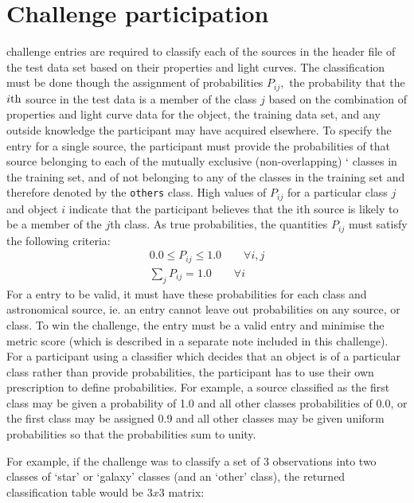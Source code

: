 \documentclass[iop,twocolumn]{emulateapj}
\newcommand{\<}      {\langle}
\renewcommand{\>}    {\rangle}
\begin{document}
\section{Challenge participation}
\label{sec:conclusion}
{\plasticc} challenge entries are required to classify each of the sources in the header file of the test data set  based on their properties and light curves. The classification must be done though the assignment of probabilities $P_{ij},$ 
the probability that the $i\rm{th}$ source in the test data is a member of the class $j$ based on the combination of properties and light curve data for the object, the training data set, and any outside knowledge the participant may have acquired elsewhere. To specify the entry for a single source, the participant must provide the probabilities of that source belonging to each of the mutually exclusive (non-overlapping) `{{\numclasses}}  classes in the training set, and of not belonging to any of the classes in the training set and therefore denoted by the {\tt others} class. High values of $P_{ij}$ for a particular class $j$ and object $i$ indicate that the participant believes that the ith source is likely to be a member of the $j$th class. 
As true probabilities, the quantities $P_{ij}$ must satisfy the following criteria:
\begin{eqnarray*}
0.0 \leq P_{ij} \leq 1.0 \qquad \forall i, j \nonumber \\
\sum_{j} P_{ij} = 1.0 \qquad \forall i
\nonumber
\end{eqnarray*}
For a {\plasticc} entry to be valid, it must have these probabilities for each class and astronomical source, ie. an entry cannot leave out probabilities on any source, or class. To win the challenge, the entry must be a valid entry and minimise the {\plasticc} metric score (which is described in a separate note included in this challenge). 
For a participant using a classifier which decides that an object is of a particular class rather than provide probabilities, the participant has to use their own prescription to define probabilities. For example, a source classified as the first class may be given a probability of 1.0 and all other classes probabilities of 0.0, or the first class may be assigned 0.9 and all other classes may be given uniform probabilities so that the probabilities sum to unity. 

For example, if the challenge was to classify a set of 3 observations into two classes of `star' or `galaxy' classes (and an `other' class), the returned classification table would be $3x3$ matrix:
\end{document}
